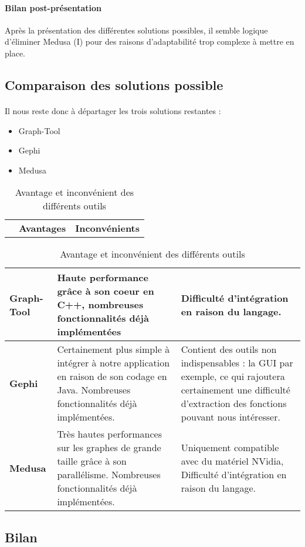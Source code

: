   \paragraph{Bilan post-présentation}
  Après la présentation des différentes solutions possibles, il semble logique d'éliminer  Medusa (I) pour des raisons d'adaptabilité trop complexe à mettre en place.
  
  \subsection{Comparaison des solutions possible}
  
  \paragraph{}
  Il nous reste donc à départager les trois solutions restantes : 
  \begin{itemize}
  	\item Graph-Tool
  	\item Gephi
  	\item Medusa
  \end{itemize}

    
    \begin{table}[H]
      
      \centering
    
    \begin{tabular}{p{3.5cm}  p{6cm}  p{6cm} }

	& \textbf{Avantages} 		& \textbf{Inconvénients}\\ 
    	
    \end{tabular}

    
    \begin{tabular}{|p{3.5cm} | p{6cm} | p{6cm} |}
      
      \hline
      \textbf{Graph-Tool} 	& Haute performance grâce à son coeur en C++, nombreuses fonctionnalités déjà implémentées	
				& Difficulté d'intégration en raison du langage. \\ \hline
      \textbf{Gephi} 		& Certainement plus simple à intégrer à notre application en raison de son codage en Java. Nombreuses fonctionnalités déjà implémentées.
				& Contient des outils non indispensables : la GUI par exemple, ce qui rajoutera certainement une difficulté d'extraction des fonctions pouvant nous intéresser. 	\\ \hline
      \textbf{Medusa} 		& Très hautes performances sur les graphes de grande taille grâce à son parallélisme. Nombreuses fonctionnalités déjà implémentées.
				& Uniquement compatible avec du matériel NVidia, Difficulté d'intégration en raison du langage.	\\ \hline
    \end{tabular}

    \caption{Avantage et inconvénient des différents outils }
  \end{table}
  
  
  \subsection{Bilan}
  
  
